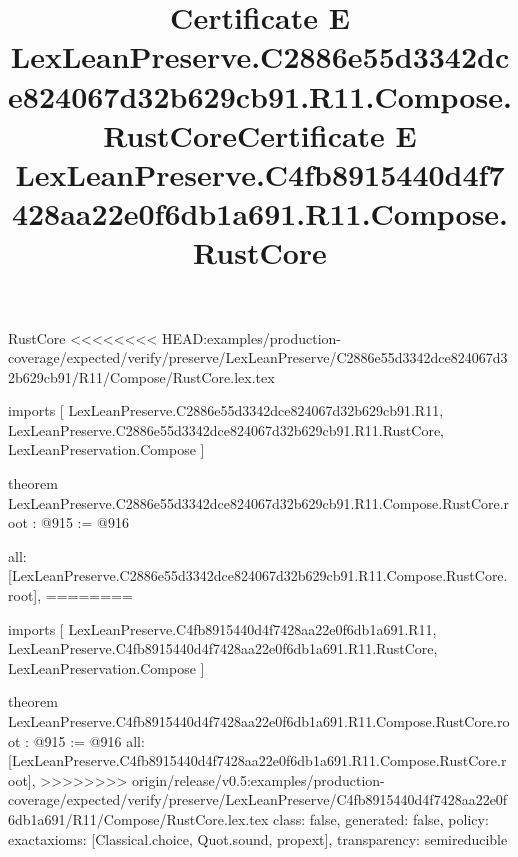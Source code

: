 \begin{lexlean}{RustCore}
<<<<<<<< HEAD:examples/production-coverage/expected/verify/preserve/LexLeanPreserve/C2886e55d3342dce824067d32b629cb91/R11/Compose/RustCore.lex.tex
\title{Certificate E LexLeanPreserve.C2886e55d3342dce824067d32b629cb91.R11.Compose.RustCore}
\begin{coremodule}
imports [
  LexLeanPreserve.C2886e55d3342dce824067d32b629cb91.R11,
  LexLeanPreserve.C2886e55d3342dce824067d32b629cb91.R11.RustCore,
  LexLeanPreservation.Compose
]

theorem LexLeanPreserve.C2886e55d3342dce824067d32b629cb91.R11.Compose.RustCore.root : @915 := @916 {
  all: [LexLeanPreserve.C2886e55d3342dce824067d32b629cb91.R11.Compose.RustCore.root],
========
\title{Certificate E LexLeanPreserve.C4fb8915440d4f7428aa22e0f6db1a691.R11.Compose.RustCore}
\begin{coremodule}
imports [
  LexLeanPreserve.C4fb8915440d4f7428aa22e0f6db1a691.R11,
  LexLeanPreserve.C4fb8915440d4f7428aa22e0f6db1a691.R11.RustCore,
  LexLeanPreservation.Compose
]

theorem LexLeanPreserve.C4fb8915440d4f7428aa22e0f6db1a691.R11.Compose.RustCore.root : @915 := @916 {
  all: [LexLeanPreserve.C4fb8915440d4f7428aa22e0f6db1a691.R11.Compose.RustCore.root],
>>>>>>>> origin/release/v0.5:examples/production-coverage/expected/verify/preserve/LexLeanPreserve/C4fb8915440d4f7428aa22e0f6db1a691/R11/Compose/RustCore.lex.tex
  class: false,
  generated: false,
  policy: exact{axioms: [Classical.choice, Quot.sound, propext]},
  transparency: semireducible
}


\end{coremodule}}
\end{coremodule}
\end{lexlean}
